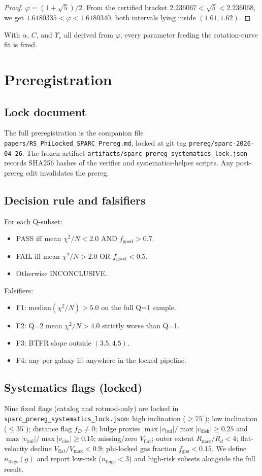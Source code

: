 \documentclass[11pt,a4paper]{article}
\newcommand{\Ystar}{\ensuremath{\Upsilon_{\star}}}
\newcommand{\chiN}{\ensuremath{\chi^{2}/N}}
\theoremstyle{plain}
\theoremstyle{definition}
\begin{document}
\begin{proof}
$\varphi = (1+\sqrt{5})/2$. From the certified bracket $2.236067 < \sqrt{5} < 2.236068$, we get $1.6180335 < \varphi < 1.6180340$, both intervals lying inside $(1.61, 1.62)$.
\end{proof}

With $\alpha$, $C$, and $\Ystar$ all derived from $\varphi$, every parameter feeding the rotation-curve fit is fixed.

\section{Preregistration}

\subsection{Lock document}
The full preregistration is the companion file \texttt{papers/RS\_PhiLocked\_SPARC\_Prereg.md}, locked at git tag \texttt{prereg/sparc-2026-04-26}. The frozen artifact \texttt{artifacts/sparc\_prereg\_systematics\_lock.json} records SHA256 hashes of the verifier and systematics-helper scripts. Any post-prereg edit invalidates the prereg.

\subsection{Decision rule and falsifiers}
For each Q-subset:
\begin{itemize}\itemsep0pt
\item PASS iff mean $\chiN < 2.0$ AND $f_{\mathrm{good}} > 0.7$.
\item FAIL iff mean $\chiN > 2.0$ OR $f_{\mathrm{good}} < 0.5$.
\item Otherwise INCONCLUSIVE.
\end{itemize}

Falsifiers:
\begin{itemize}\itemsep0pt
\item F1: $\mathrm{median}(\chiN) > 5.0$ on the full Q=1 sample.
\item F2: Q=2 mean $\chiN > 4.0$ strictly worse than Q=1.
\item F3: BTFR slope outside $(3.5, 4.5)$.
\item F4: any per-galaxy fit anywhere in the locked pipeline.
\end{itemize}

\subsection{Systematics flags (locked)}
Nine fixed flags (catalog and rotmod-only) are locked in \texttt{sparc\_prereg\_systematics\_lock.json}: high inclination ($\geq 75^{\circ}$); low inclination ($\leq 35^{\circ}$); distance flag $f_D \neq 0$; bulge proxies $\max|v_{\mathrm{bul}}|/\max|v_{\mathrm{disk}}| \geq 0.25$ and $\max|v_{\mathrm{bul}}|/\max|v_{\mathrm{obs}}| \geq 0.15$; missing/zero $V_{\mathrm{flat}}$; outer extent $R_{\max}/R_d < 4$; flat-velocity decline $V_{\mathrm{flat}}/V_{\max} < 0.9$; phi-locked gas fraction $f_{\mathrm{gas}} < 0.15$. We define $n_{\mathrm{flags}}(g)$ and report low-risk ($n_{\mathrm{flags}} < 3$) and high-risk subsets alongside the full result.
\end{document}
